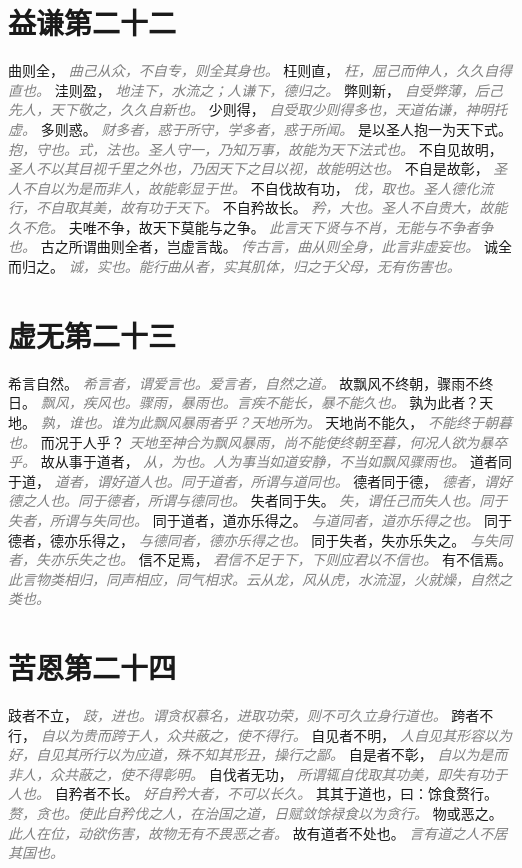 \documentclass[a4paper,zihao=-4,oneside,landscape,UTF8]{ctexart}
\newcommand{\zhushi}[1]{\scriptsize{\textit{\textcolor{gray}{#1}}}\normalsize}
\begin{document}
\section{益谦第二十二}

曲则全，
\zhushi{曲己从众，不自专，则全其身也。}
枉则直，
\zhushi{枉，屈己而伸人，久久自得直也。}
洼则盈，
\zhushi{地洼下，水流之；人谦下，德归之。}
弊则新，
\zhushi{自受弊薄，后己先人，天下敬之，久久自新也。}
少则得，
\zhushi{自受取少则得多也，天道佑谦，神明托虚。}
多则惑。
\zhushi{财多者，惑于所守，学多者，惑于所闻。}
是以圣人抱一为天下式。
\zhushi{抱，守也。式，法也。圣人守一，乃知万事，故能为天下法式也。}
不自见故明，
\zhushi{圣人不以其目视千里之外也，乃因天下之目以视，故能明达也。}
不自是故彰，
\zhushi{圣人不自以为是而非人，故能彰显于世。}
不自伐故有功，
\zhushi{伐，取也。圣人德化流行，不自取其美，故有功于天下。}
不自矜故长。
\zhushi{矜，大也。圣人不自贵大，故能久不危。}
夫唯不争，故天下莫能与之争。
\zhushi{此言天下贤与不肖，无能与不争者争也。}
古之所谓曲则全者，岂虚言哉。
\zhushi{传古言，曲从则全身，此言非虚妄也。}
诚全而归之。
\zhushi{诚，实也。能行曲从者，实其肌体，归之于父母，无有伤害也。}


\section{虚无第二十三}

希言自然。
\zhushi{希言者，谓爱言也。爱言者，自然之道。}
故飘风不终朝，骤雨不终日。
\zhushi{飘风，疾风也。骤雨，暴雨也。言疾不能长，暴不能久也。}
孰为此者？天地。
\zhushi{孰，谁也。谁为此飘风暴雨者乎？天地所为。}
天地尚不能久，
\zhushi{不能终于朝暮也。}
而况于人乎？
\zhushi{天地至神合为飘风暴雨，尚不能使终朝至暮，何况人欲为暴卒乎。}
故从事于道者，
\zhushi{从，为也。人为事当如道安静，不当如飘风骤雨也。}
道者同于道，
\zhushi{道者，谓好道人也。同于道者，所谓与道同也。}
德者同于德，
\zhushi{德者，谓好德之人也。同于德者，所谓与德同也。}
失者同于失。
\zhushi{失，谓任己而失人也。同于失者，所谓与失同也。}
同于道者，道亦乐得之。
\zhushi{与道同者，道亦乐得之也。}
同于德者，德亦乐得之，
\zhushi{与德同者，德亦乐得之也。}
同于失者，失亦乐失之。
\zhushi{与失同者，失亦乐失之也。}
信不足焉，
\zhushi{君信不足于下，下则应君以不信也。}
有不信焉。
\zhushi{此言物类相归，同声相应，同气相求。云从龙，风从虎，水流湿，火就燥，自然之类也。}


\section{苦恩第二十四}

跂者不立，
\zhushi{跂，进也。谓贪权慕名，进取功荣，则不可久立身行道也。}
跨者不行，
\zhushi{自以为贵而跨于人，众共蔽之，使不得行。}
自见者不明，
\zhushi{人自见其形容以为好，自见其所行以为应道，殊不知其形丑，操行之鄙。}
自是者不彰，
\zhushi{自以为是而非人，众共蔽之，使不得彰明。}
自伐者无功，
\zhushi{所谓辄自伐取其功美，即失有功于人也。}
自矜者不长。
\zhushi{好自矜大者，不可以长久。}
其其于道也，曰：馀食赘行。
\zhushi{赘，贪也。使此自矜伐之人，在治国之道，日赋敛馀禄食以为贪行。}
物或恶之。
\zhushi{此人在位，动欲伤害，故物无有不畏恶之者。}
故有道者不处也。
\zhushi{言有道之人不居其国也。}
\end{document}

